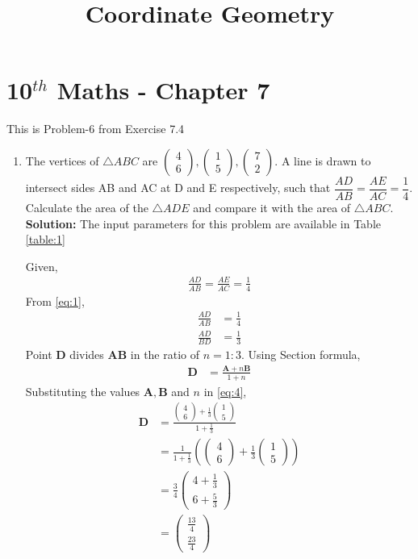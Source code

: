 \documentclass[12pt]{article}
\providecommand{\brak}[1]{\ensuremath{\left(#1\right)}}
\newcommand{\solution}{\noindent \textbf{Solution: }}
\newcommand{\myvec}[1]{\ensuremath{\begin{pmatrix}#1\end{pmatrix}}}
\let\vec\mathbf
\begin{document}
\begin{center}
\title{\textbf{Coordinate Geometry}}
\date{\vspace{-5ex}} %
\maketitle
\end{center}
\setcounter{page}{1}
\section*{10$^{th}$ Maths - Chapter 7}
This is Problem-6 from Exercise 7.4
\begin{enumerate}
\item The vertices of $\triangle ABC$ are $\myvec{4 \\ 6}, \myvec{1\\5}, \myvec{7\\2}$. A line is drawn to intersect sides AB and AC at D and E respectively, such that $\dfrac{AD}{AB}=\dfrac{AE}{AC}=\dfrac{1}{4}$. Calculate the area of the $\triangle ADE$ and compare it with the area of $\triangle ABC$.\\
\solution The input parameters for this problem are available in Table \eqref{table:1}
\begin{table}[ht!]\centering

\caption{}
\label{table:1}	
\end{table}

Given,
\begin{align}
\frac{AD}{AB}=\frac{AE}{AC}=\frac{1}{4}\label{eq:1}
\end{align}
From \eqref{eq:1},
\begin{align}
\frac{AD}{AB} &=\frac{1}{4}\\
\frac{AD}{BD} &=\frac{1}{3}
\end{align}
Point $\vec{D}$ divides $\vec{A}\vec{B}$ in the ratio of $n = 1:3$.
	Using Section formula,
\begin{align}
\vec{D} &=\frac{\vec{A}+n\vec{B}}{1+n}\label{eq:4}
\end{align}
Substituting the values $\vec{A},\vec{B}$ and $n$ in \eqref{eq:4},
\begin{align}
\vec{D} &=\frac{{\myvec{4\\6}+\frac{1}{3}\myvec{1\\5}}}{1+\frac{1}{3}}\\
	&=\frac{1}{1+\frac{1}{3}}\brak{{\myvec{4\\6}+\frac{1}{3}\myvec{1\\5}}} \\
	&=\frac{3}{4}\myvec{4+\frac{1}{3}\\[2pt]6+\frac{5}{3}}\\
	&=\myvec{\frac{13}{4}\\[2pt] \frac{23}{4}}
\end{align}


\end{enumerate}
\end{document}

